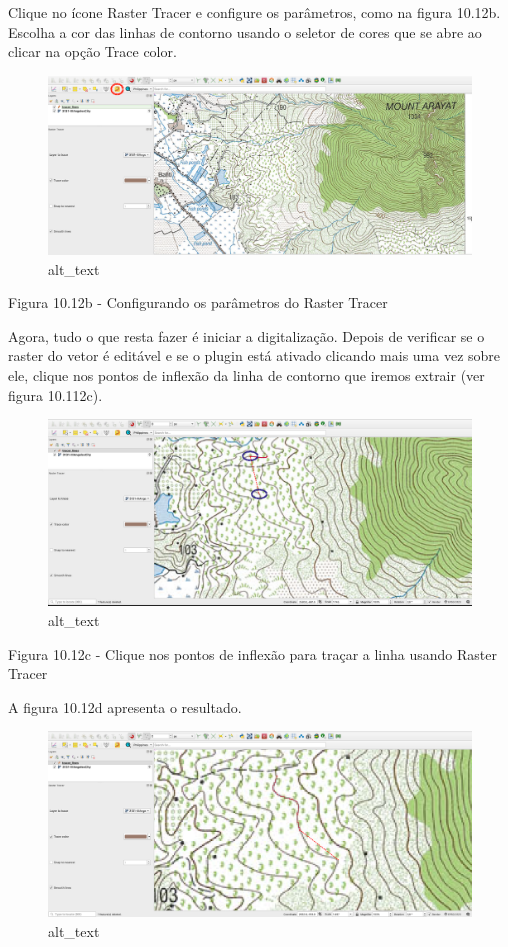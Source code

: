\documentclass[
]{book}
\begin{document}
Clique no ícone Raster Tracer e configure os parâmetros, como na figura 10.12b. Escolha a cor das linhas de contorno usando o seletor de cores que se abre ao clicar na opção Trace color.

\begin{figure}
\centering
\includegraphics{media/modulo10/fig1012_b.png}
\caption{alt\_text}
\end{figure}

Figura 10.12b - Configurando os parâmetros do Raster Tracer

Agora, tudo o que resta fazer é iniciar a digitalização. Depois de verificar se o raster do vetor é editável e se o plugin está ativado clicando mais uma vez sobre ele, clique nos pontos de inflexão da linha de contorno que iremos extrair (ver figura 10.112c).

\begin{figure}
\centering
\includegraphics{media/modulo10/fig1012_c.png}
\caption{alt\_text}
\end{figure}

Figura 10.12c - Clique nos pontos de inflexão para traçar a linha usando Raster Tracer

A figura 10.12d apresenta o resultado.

\begin{figure}
\centering
\includegraphics{media/modulo10/fig1012_d.png}
\caption{alt\_text}
\end{figure}
\end{document}
